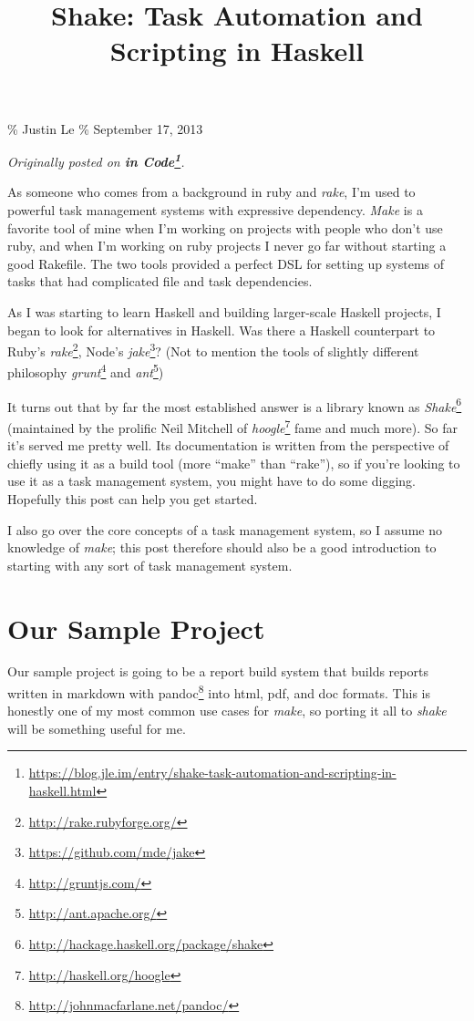 \documentclass[]{article}
\title{Shake: Task Automation and Scripting in Haskell}
\renewcommand{\href}[2]{#2\footnote{\url{#1}}}
\begin{document}
\maketitle

\% Justin Le \% September 17, 2013

\emph{Originally posted on
\textbf{\href{https://blog.jle.im/entry/shake-task-automation-and-scripting-in-haskell.html}{in
Code}}.}

As someone who comes from a background in ruby and \emph{rake}, I'm used to
powerful task management systems with expressive dependency. \emph{Make} is a
favorite tool of mine when I'm working on projects with people who don't use
ruby, and when I'm working on ruby projects I never go far without starting a
good Rakefile. The two tools provided a perfect DSL for setting up systems of
tasks that had complicated file and task dependencies.

As I was starting to learn Haskell and building larger-scale Haskell projects, I
began to look for alternatives in Haskell. Was there a Haskell counterpart to
Ruby's \href{http://rake.rubyforge.org/}{\emph{rake}}, Node's
\href{https://github.com/mde/jake}{\emph{jake}}? (Not to mention the tools of
slightly different philosophy \href{http://gruntjs.com/}{\emph{grunt}} and
\href{http://ant.apache.org/}{\emph{ant}})

It turns out that by far the most established answer is a library known as
\href{http://hackage.haskell.org/package/shake}{\emph{Shake}} (maintained by the
prolific Neil Mitchell of \href{http://haskell.org/hoogle}{\emph{hoogle}} fame
and much more). So far it's served me pretty well. Its documentation is written
from the perspective of chiefly using it as a build tool (more ``make'' than
``rake''), so if you're looking to use it as a task management system, you might
have to do some digging. Hopefully this post can help you get started.

I also go over the core concepts of a task management system, so I assume no
knowledge of \emph{make}; this post therefore should also be a good introduction
to starting with any sort of task management system.

\section{Our Sample Project}\label{our-sample-project}

Our sample project is going to be a report build system that builds reports
written in markdown with \href{http://johnmacfarlane.net/pandoc/}{pandoc} into
html, pdf, and doc formats. This is honestly one of my most common use cases for
\emph{make}, so porting it all to \emph{shake} will be something useful for me.
\end{document}
